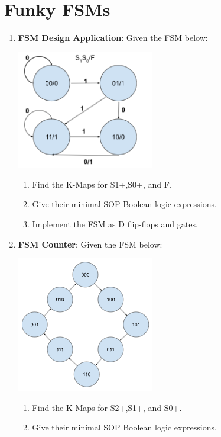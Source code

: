 \documentclass{article}
\begin{document}
\section{Funky FSMs}
    \begin{enumerate}[label=(\alph*)]
        \item \textbf{FSM Design Application}: Given the FSM below:
        \begin{multicols}{2}
        \begin{center}
        \includegraphics[width=6cm]{figures/FSMDesign.png}
        \end{center}
        \columnbreak
        \end{multicols}
        \begin{enumerate}[label=(\roman*),nolistsep,itemsep = 60pt]
            \item Find the K-Maps for S1+,S0+, and F.
            \item Give their minimal SOP Boolean logic expressions.
            \item Implement the FSM as D flip-flops and gates.
        \end{enumerate}
        \newpage

        \item \textbf{FSM Counter}: Given the FSM below:
        \begin{multicols}{2}
            \begin{center}
            \includegraphics[width=6cm]{figures/FSMClock.png}
            \end{center}
            \columnbreak
            \end{multicols}
        \begin{enumerate}[label=(\roman*),nolistsep,itemsep = 60pt]
            \item Find the K-Maps for S2+,S1+, and S0+.
            \item Give their minimal SOP Boolean logic expressions.
        \end{enumerate}



\end{enumerate}
\end{document}
